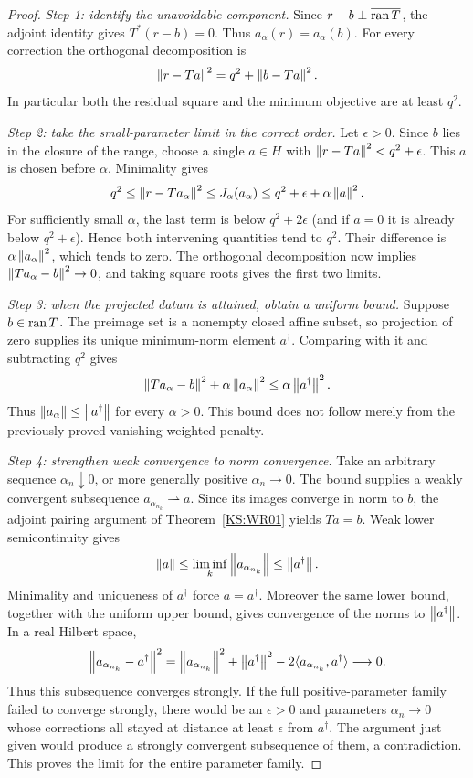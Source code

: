 \begin{proof}
\emph{Step 1: identify the unavoidable component.} Since $r-b\perp\overline{\operatorname{ran} T}$, the adjoint identity gives $T^*(r-b)=0$. Thus $a_\alpha(r)=a_\alpha(b)$. For every correction the orthogonal decomposition is
\[
 \left\lVert r-Ta\right\rVert^2=q^2+\left\lVert b-Ta\right\rVert^2.
\]
In particular both the residual square and the minimum objective are at least $q^2$.

\emph{Step 2: take the small-parameter limit in the correct order.} Let $\epsilon>0$. Since $b$ lies in the closure of the range, choose a single $a\in H$ with $\left\lVert r-Ta\right\rVert^2<q^2+\epsilon$. This $a$ is chosen before $\alpha$. Minimality gives
\[
 q^2\le\left\lVert r-Ta_\alpha\right\rVert^2
 \le J_\alpha(a_\alpha)
 \le q^2+\epsilon+\alpha\left\lVert a\right\rVert^2.
\]
For sufficiently small $\alpha$, the last term is below $q^2+2\epsilon$ (and if $a=0$ it is already below $q^2+\epsilon$). Hence both intervening quantities tend to $q^2$. Their difference is $\alpha\left\lVert a_\alpha\right\rVert^2$, which tends to zero. The orthogonal decomposition now implies $\left\lVert Ta_\alpha-b\right\rVert^2\to0$, and taking square roots gives the first two limits.

\emph{Step 3: when the projected datum is attained, obtain a uniform bound.} Suppose $b\in\operatorname{ran} T$. The preimage set is a nonempty closed affine subset, so projection of zero supplies its unique minimum-norm element $a^\dagger$. Comparing with it and subtracting $q^2$ gives
\[
 \left\lVert Ta_\alpha-b\right\rVert^2+\alpha\left\lVert a_\alpha\right\rVert^2
 \le\alpha\left\lVert a^\dagger\right\rVert^2.
\]
Thus $\left\lVert a_\alpha\right\rVert\le\left\lVert a^\dagger\right\rVert$ for every $\alpha>0$. This bound does not follow merely from the previously proved vanishing weighted penalty.

\emph{Step 4: strengthen weak convergence to norm convergence.} Take an arbitrary sequence $\alpha_n\downarrow0$, or more generally positive $\alpha_n\to0$. The bound supplies a weakly convergent subsequence $a_{\alpha_{n_k}}\rightharpoonup a$. Since its images converge in norm to $b$, the adjoint pairing argument of Theorem~\ref{KS:WR01} yields $Ta=b$. Weak lower semicontinuity gives
\[
 \left\lVert a\right\rVert\le\liminf_k\left\lVert a_{\alpha_{n_k}}\right\rVert
 \le\left\lVert a^\dagger\right\rVert.
\]
Minimality and uniqueness of $a^\dagger$ force $a=a^\dagger$. Moreover the same lower bound, together with the uniform upper bound, gives convergence of the norms to $\left\lVert a^\dagger\right\rVert$. In a real Hilbert space,
\[
 \left\lVert a_{\alpha_{n_k}}-a^\dagger\right\rVert^2
 =\left\lVert a_{\alpha_{n_k}}\right\rVert^2+\left\lVert a^\dagger\right\rVert^2
       -2\langle a_{\alpha_{n_k}},a^\dagger\rangle\longrightarrow0.
\]
Thus this subsequence converges strongly. If the full positive-parameter family failed to converge strongly, there would be an $\epsilon>0$ and parameters $\alpha_n\to0$ whose corrections all stayed at distance at least $\epsilon$ from $a^\dagger$. The argument just given would produce a strongly convergent subsequence of them, a contradiction. This proves the limit for the entire parameter family.


\end{proof}
